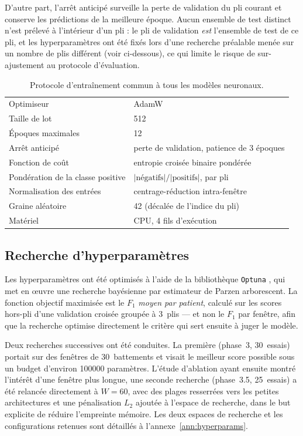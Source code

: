 D'autre part, l'arrêt anticipé surveille la perte de validation du pli courant et conserve les prédictions de la meilleure époque. Aucun ensemble de test distinct n'est prélevé à l'intérieur d'un pli : le pli de validation \emph{est} l'ensemble de test de ce pli, et les hyperparamètres ont été fixés lors d'une recherche préalable menée sur un nombre de plis différent (voir ci-dessous), ce qui limite le risque de sur-ajustement au protocole d'évaluation.

\begin{table}[H]
  \centering
  \caption{Protocole d'entraînement commun à tous les modèles neuronaux.}
  \label{tab:meth:entrainement}
  \begin{tabular}{ll}
    \toprule
    Optimiseur                  & AdamW \\
    Taille de lot               & 512 \\
    Époques maximales           & 12 \\
    Arrêt anticipé              & perte de validation, patience de 3 époques \\
    Fonction de coût            & entropie croisée binaire pondérée \\
    Pondération de la classe positive & \(|\text{négatifs}| / |\text{positifs}|\), par pli \\
    Normalisation des entrées   & centrage-réduction intra-fenêtre \\
    Graine aléatoire            & 42 (décalée de l'indice du pli) \\
    Matériel                    & CPU, 4 fils d'exécution \\
    \bottomrule
  \end{tabular}
\end{table}

\subsection{Recherche d'hyperparamètres}
Les hyperparamètres ont été optimisés à l'aide de la bibliothèque \texttt{Optuna} \cite{akiba2019optuna}, qui met en {\oe}uvre une recherche bayésienne par estimateur de Parzen arborescent. La fonction objectif maximisée est le \(F_1\) \emph{moyen par patient}, calculé sur les scores hors-pli d'une validation croisée groupée à 3~plis — et non le \(F_1\) par fenêtre, afin que la recherche optimise directement le critère qui sert ensuite à juger le modèle.

Deux recherches successives ont été conduites. La première (phase~3, 30~essais) portait sur des fenêtres de 30~battements et visait le meilleur score possible sous un budget d'environ \num{100000} paramètres. L'étude d'ablation ayant ensuite montré l'intérêt d'une fenêtre plus longue, une seconde recherche (phase~3.5, 25~essais) a été relancée directement à \(W = 60\), avec des plages resserrées vers les petites architectures et une pénalisation \(L_2\) ajoutée à l'espace de recherche, dans le but explicite de réduire l'empreinte mémoire. Les deux espaces de recherche et les configurations retenues sont détaillés à l'annexe~\ref{ann:hyperparams}.

